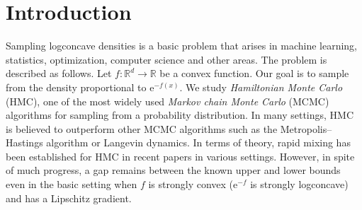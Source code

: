 \documentclass[11pt]{article}
\numberwithin{equation}{section}
\theoremstyle{definition}
\theoremstyle{plain}
\newcommand{\R}{\mathbb R}
\newcommand{\eee}{\mathrm e}
\begin{document}
%
%
%
















\section{Introduction}

Sampling logconcave densities is a basic problem that arises in machine learning, statistics, optimization, computer science and other areas. The problem is described as follows. Let $f: \R^d \to \R$ be a convex function. Our goal is to sample from the density proportional to $\eee^{-f(x)}$. We study \textit{Hamiltonian Monte Carlo} (HMC), one of the most
%
widely used   %
\textit{Markov chain Monte Carlo} (MCMC) algorithms for sampling from a probability distribution. In many settings, HMC is believed to outperform other MCMC algorithms such as the Metropolis--Hastings algorithm or Langevin dynamics. 
In terms of theory, rapid mixing has been established for HMC in recent papers \cite{LSV18,LV18,MS17,MS19,MV18}
%
in  %
various settings. However, in spite of much progress,
%
a gap remains %
between
the  %
known upper and lower bounds even in the basic setting when $f$ is strongly convex ($\eee^{-f}$ is strongly logconcave) and has a Lipschitz gradient.  

%
\end{document}
